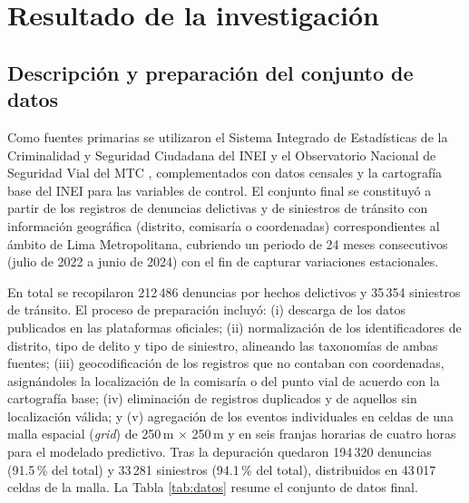 
\chapter{Resultado de la investigaci\'on}

\section{Descripci\'on y preparaci\'on del conjunto de datos}

Como fuentes primarias se utilizaron el Sistema Integrado de Estad\'isticas de la Criminalidad y Seguridad Ciudadana del INEI \citep{inei2022sistema} y el Observatorio Nacional de Seguridad Vial del MTC \citep{mtc2024observatorio}, complementados con datos censales y la cartograf\'ia base del INEI para las variables de control. El conjunto final se constituy\'o a partir de los registros de denuncias delictivas y de siniestros de tr\'ansito con informaci\'on geogr\'afica (distrito, comisar\'ia o coordenadas) correspondientes al \'ambito de Lima Metropolitana, cubriendo un periodo de 24 meses consecutivos (julio de 2022 a junio de 2024) con el fin de capturar variaciones estacionales.

En total se recopilaron 212\,486 denuncias por hechos delictivos y 35\,354 siniestros de tr\'ansito. El proceso de preparaci\'on incluy\'o: (i) descarga de los datos publicados en las plataformas oficiales; (ii) normalizaci\'on de los identificadores de distrito, tipo de delito y tipo de siniestro, alineando las taxonom\'ias de ambas fuentes; (iii) geocodificaci\'on de los registros que no contaban con coordenadas, asign\'andoles la localizaci\'on de la comisar\'ia o del punto vial de acuerdo con la cartograf\'ia base; (iv) eliminaci\'on de registros duplicados y de aquellos sin localizaci\'on v\'alida; y (v) agregaci\'on de los eventos individuales en celdas de una malla espacial (\textit{grid}) de 250\,m $\times$ 250\,m y en seis franjas horarias de cuatro horas para el modelado predictivo. Tras la depuraci\'on quedaron 194\,320 denuncias (91.5\,\% del total) y 33\,281 siniestros (94.1\,\% del total), distribuidos en 43\,017 celdas de la malla. La Tabla \ref{tab:datos} resume el conjunto de datos final.

